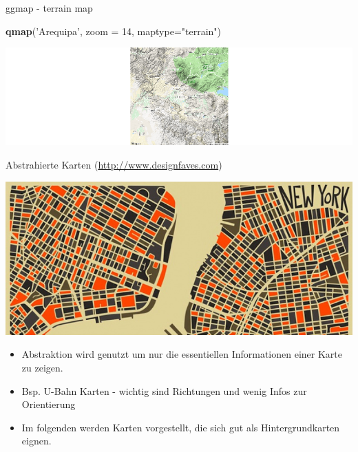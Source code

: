 \documentclass[ignorenonframetext,]{beamer}
\newenvironment{Shaded}{\begin{snugshade}}{\end{snugshade}}
\newcommand{\DataTypeTok}[1]{\textcolor[rgb]{0.13,0.29,0.53}{#1}}
\newcommand{\DecValTok}[1]{\textcolor[rgb]{0.00,0.00,0.81}{#1}}
\newcommand{\KeywordTok}[1]{\textcolor[rgb]{0.13,0.29,0.53}{\textbf{#1}}}
\newcommand{\NormalTok}[1]{#1}
\newcommand{\StringTok}[1]{\textcolor[rgb]{0.31,0.60,0.02}{#1}}
\begin{document}
\begin{frame}[fragile]{ggmap - terrain map}
\protect\hypertarget{ggmap---terrain-map}{}

\begin{Shaded}
\begin{Highlighting}[]
\KeywordTok{qmap}\NormalTok{(}\StringTok{'Arequipa'}\NormalTok{, }\DataTypeTok{zoom =} \DecValTok{14}\NormalTok{,}
 \DataTypeTok{maptype=}\StringTok{"terrain"}\NormalTok{)}
\end{Highlighting}
\end{Shaded}

\includegraphics{figure/Areqipa.png}

\end{frame}

\begin{frame}{Abstrahierte Karten
(\href{http://www.designfaves.com/2014/03/abstracted-maps-reveal-cities-personalities}{http://www.designfaves.com})}
\protect\hypertarget{abstrahierte-karten-httpwww.designfaves.com}{}

\includegraphics{figure/NYabstracted.jpg}

\begin{itemize}
\item
  Abstraktion wird genutzt um nur die essentiellen Informationen einer
  Karte zu zeigen.
\item
  Bsp. U-Bahn Karten - wichtig sind Richtungen und wenig Infos zur
  Orientierung
\item
  Im folgenden werden Karten vorgestellt, die sich gut als
  Hintergrundkarten eignen.
\end{itemize}

\end{frame}
\end{document}
